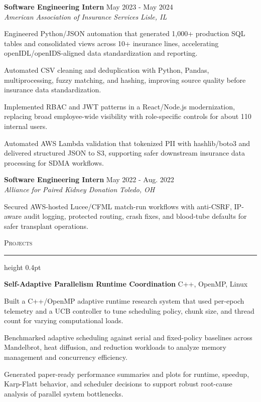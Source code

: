 \documentclass[letterpaper,11pt]{article}
\newcommand{\resumesection}[1]{%
  \par\vspace{2pt}%
  {\large\scshape #1}\par\vspace{2pt}%
  \hrule height 0.4pt\vspace{2pt}%
}
\newcommand{\resumeSubheading}[4]{
  \textbf{#1} \hfill #2\\
  \textit{#3} \hfill \textit{#4}
}
\newcommand{\projectHeading}[2]{
  \textbf{#1} \hfill #2
}
\begin{document}
\resumeSubheading
{Software Engineering Intern}{May 2023 - May 2024}
{American Association of Insurance Services}{Lisle, IL}
\begin{tightitemize}
  \item Engineered Python/JSON automation that generated 1,000+ production SQL tables and consolidated views across 10+ insurance lines, accelerating openIDL/openIDS-aligned data standardization and reporting.
  \item Automated CSV cleaning and deduplication with Python, Pandas, multiprocessing, fuzzy matching, and hashing, improving source quality before insurance data standardization.
  \item Implemented RBAC and JWT patterns in a React/Node.js modernization, replacing broad employee-wide visibility with role-specific controls for about 110 internal users.
  \item Automated AWS Lambda validation that tokenized PII with hashlib/boto3 and delivered structured JSON to S3, supporting safer downstream insurance data processing for SDMA workflows.
\end{tightitemize}

\resumeSubheading
{Software Engineering Intern}{May 2022 - Aug. 2022}
{Alliance for Paired Kidney Donation}{Toledo, OH}
\begin{tightitemize}
  \item Secured AWS-hosted Lucee/CFML match-run workflows with anti-CSRF, IP-aware audit logging, protected routing, crash fixes, and blood-tube defaults for safer transplant operations.
\end{tightitemize}

\resumesection{Projects}
\projectHeading{Self-Adaptive Parallelism Runtime Coordination}{C++, OpenMP, Linux}
\begin{tightitemize}
  \item Built a C++/OpenMP adaptive runtime research system that used per-epoch telemetry and a UCB controller to tune scheduling policy, chunk size, and thread count for varying computational loads.
  \item Benchmarked adaptive scheduling against serial and fixed-policy baselines across Mandelbrot, heat diffusion, and reduction workloads to analyze memory management and concurrency efficiency.
  \item Generated paper-ready performance summaries and plots for runtime, speedup, Karp-Flatt behavior, and scheduler decisions to support robust root-cause analysis of parallel system bottlenecks.
\end{tightitemize}
\end{document}

